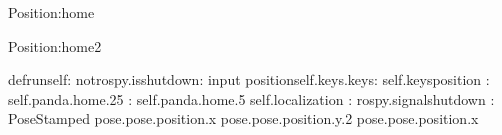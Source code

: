 \documentclass[letterpaper,10pt,english]{sphinxmanual}
\begin{document}
\begin{sphinxVerbatim}[commandchars=\\\{\}]
\PYGZdl{}Position:home
\end{sphinxVerbatim}





\begin{sphinxVerbatim}[commandchars=\\\{\}]
\PYGZdl{}Position:home2
\end{sphinxVerbatim}









\begin{sphinxVerbatim}[commandchars=\\\{\}]
defrunself:
notrospy.is\PYGZus{}shutdown:
input
positionself.keys.keys:
self.keys\PYG{o}{[}position\PYG{o}{]}
:
self.panda.home.25
:
self.panda.home.5
self.localization
:
rospy.signal\PYGZus{}shutdown
:
PoseStamped
pose.pose.position.x
pose.pose.position.y.2
pose.pose.position.x


\end{sphinxVerbatim}
\end{document}
